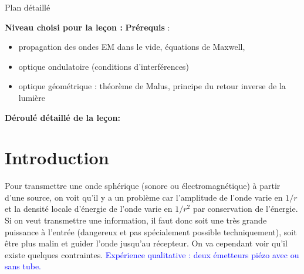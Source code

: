 \begin{reportBlock}{Plan détaillé}

  \textbf{Niveau choisi pour la leçon :}
  \newline
  \textbf{Prérequis} : \begin{itemize}
      \item propagation des ondes EM dans le vide, équations de Maxwell,
      \item optique ondulatoire (conditions d'interférences)
      \item optique géométrique : théorème de Malus, principe du retour inverse de la lumière
  \end{itemize}

  \textbf{Déroulé détaillé de la leçon: }  
  
  \section*{Introduction}
  Pour transmettre une onde sphérique (sonore ou électromagnétique) à partir d'une source, on voit qu'il y a un problème car l'amplitude de l'onde varie en $1/r$ et la densité locale d'énergie de l'onde varie en $1/r^2$ par conservation de l'énergie. Si on veut transmettre une information, il faut donc soit une très grande puissance à l'entrée (dangereux et pas spécialement possible techniquement), soit être plus malin et guider l'onde jusqu'au récepteur. On va cependant voir qu'il existe quelques contraintes.
  \textcolor{blue}{Expérience qualitative : deux émetteurs piézo avec ou sans tube.}


  

\end{reportBlock}
